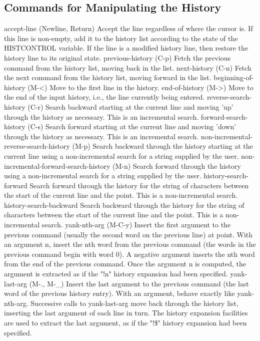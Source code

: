 \subsection{Commands for Manipulating the History}\label{sec:commandsformanipulatingthehistory}

accept-line (Newline, Return)
Accept the line regardless of where the cursor is. If this line is non-empty, add it to the history list according to the state of the HISTCONTROL variable. If the line is a modified history line, then restore the history line to its original state.
previous-history (C-p)
Fetch the previous command from the history list, moving back in the list.
next-history (C-n)
Fetch the next command from the history list, moving forward in the list.
beginning-of-history (M-<)
Move to the first line in the history.
end-of-history (M->)
Move to the end of the input history, i.e., the line currently being entered.
reverse-search-history (C-r)
Search backward starting at the current line and moving 'up' through the history as necessary. This is an incremental search.
forward-search-history (C-s)
Search forward starting at the current line and moving 'down' through the history as necessary. This is an incremental search.
non-incremental-reverse-search-history (M-p)
Search backward through the history starting at the current line using a non-incremental search for a string supplied by the user.
non-incremental-forward-search-history (M-n)
Search forward through the history using a non-incremental search for a string supplied by the user.
history-search-forward
Search forward through the history for the string of characters between the start of the current line and the point. This is a non-incremental search.
history-search-backward
Search backward through the history for the string of characters between the start of the current line and the point. This is a non-incremental search.
yank-nth-arg (M-C-y)
Insert the first argument to the previous command (usually the second word on the previous line) at point. With an argument n, insert the nth word from the previous command (the words in the previous command begin with word 0). A negative argument inserts the nth word from the end of the previous command. Once the argument n is computed, the argument is extracted as if the "!n" history expansion had been specified.
yank-last-arg (M-., M-\_)
Insert the last argument to the previous command (the last word of the previous history entry). With an argument, behave exactly like yank-nth-arg. Successive calls to yank-last-arg move back through the history list, inserting the last argument of each line in turn. The history expansion facilities are used to extract the last argument, as if the "!\$" history expansion had been specified.
